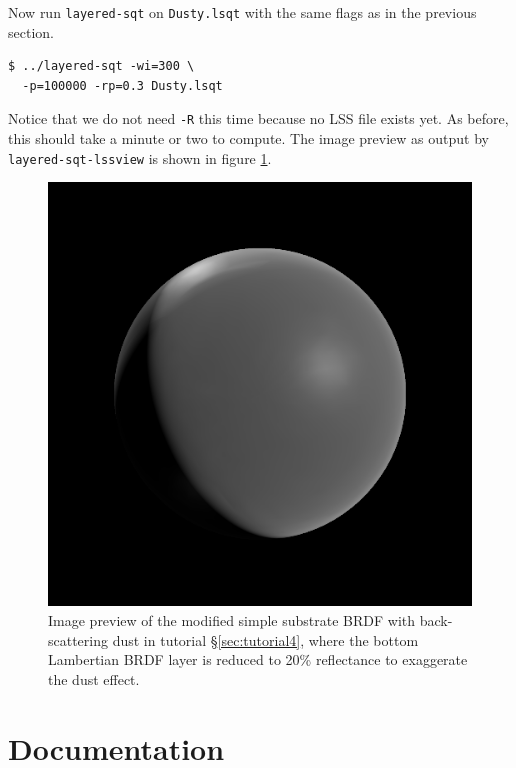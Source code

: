 \documentclass[
    twoside,
    twocolumn,
    letterpaper,
    10pt]{article}
\begin{document}
Now run \texttt{layered-sqt} on \texttt{Dusty.lsqt} with the same flags as in
the previous section.
\begin{verbatim}
$ ../layered-sqt -wi=300 \
  -p=100000 -rp=0.3 Dusty.lsqt
\end{verbatim}
Notice that we do not need \texttt{-R} this time because no LSS file 
exists yet. As before, this should take a minute or two to compute.
The image preview as output by \texttt{layered-sqt-lssview} is shown in
figure \ref{fig:tutorial4}.

\begin{figure}
\begin{center}
    \includegraphics[width=0.75\columnwidth]{tutorial4.png}
    \caption{Image preview of the modified simple substrate BRDF with 
    back-scattering
    dust in tutorial \S\ref{sec:tutorial4}, where the bottom Lambertian BRDF 
    layer is reduced to 20\% reflectance to exaggerate the dust effect.
    \label{fig:tutorial4}}
\end{center}
\end{figure}

\section{Documentation}
\label{sec:doc}
\end{document}
